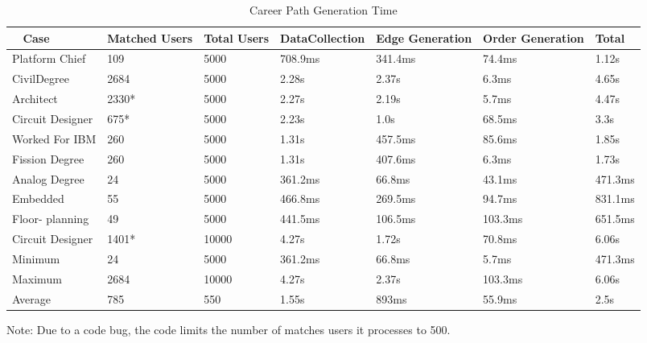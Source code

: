 \begin{table}[H]
  \centering
  \begin{tabular}{|p{17mm}|p{16mm}|p{10mm}|p{18mm}|p{19mm}|p{20mm}|p{14mm}|}
  \hline
  \
  Case&Matched Users&Total Users&Data\newline Collection&Edge\newline
  Generation&Order Generation&Total\\
  \hline\hline
  Platform Chief&109&5000&708.9ms&341.4ms&74.4ms&1.12s\\ \hline
  Civil\newline Degree&2684&5000&2.28s&2.37s&6.3ms&4.65s\\ \hline 
  Architect&2330*&5000&2.27s&2.19s&5.7ms&4.47s\\ \hline
  Circuit Designer&675*&5000&2.23s&1.0s&68.5ms&3.3s\\ \hline
  Worked For IBM&260&5000&1.31s&457.5ms&85.6ms&1.85s\\ \hline
  Fission Degree&260&5000&1.31s&407.6ms&6.3ms&1.73s\\ \hline
  Analog Degree&24&5000&361.2ms&66.8ms&43.1ms&471.3ms\\ \hline
  Embedded&55&5000&466.8ms&269.5ms&94.7ms&831.1ms\\ \hline
  Floor- \newline planning&49&5000&441.5ms&106.5ms&103.3ms&651.5ms\\ \hline
  Circuit Designer&1401*&10000&4.27s&1.72s&70.8ms&6.06s\\ \hline
  \hline\hline
  Minimum&24&5000&361.2ms&66.8ms&5.7ms&471.3ms\\ \hline
  Maximum&2684&10000&4.27s&2.37s&103.3ms&6.06s\\ \hline
  Average&785&550&1.55s&893ms&55.9ms&2.5s\\ \hline
  \end{tabular}
  \label{tab:career-perf}
  \caption{Career Path Generation Time}
\end{table}
\noindent*Note: Due to a code bug, the code limits the number of matches users
it processes to 500.

